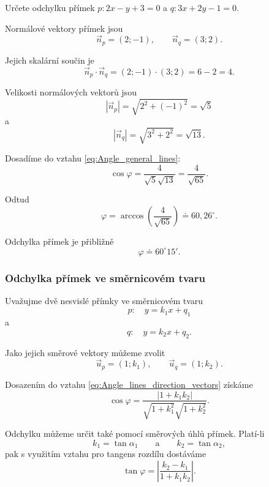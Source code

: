 \begin{example}\label{exa:Angle_general_line_equations}
    Určete odchylku přímek $p: 2x-y+3=0$ a $q:3x+2y-1=0$.

    Normálové vektory přímek jsou
    \[
        \vec{n}_p=(2;-1),
        \qquad
        \vec{n}_q=(3;2).
    \]

    Jejich skalární součin je
    \[
        \vec{n}_p\cdot\vec{n}_q
        =
        (2;-1)\cdot(3;2)
        =
        6-2
        =
        4.
    \]

    Velikosti normálových vektorů jsou
    \[
        |\vec{n}_p|=\sqrt{2^2+(-1)^2}=\sqrt5
    \]
    a
    \[
        |\vec{n}_q|=\sqrt{3^2+2^2}=\sqrt{13}.
    \]

    Dosadíme do vztahu \eqref{eq:Angle_general_lines}:
    \[
        \cos\varphi
        =
        \frac{4}{\sqrt5\sqrt{13}}
        =
        \frac{4}{\sqrt{65}}.
    \]

    Odtud
    \[
        \varphi
        =
        \arccos\left(\frac{4}{\sqrt{65}}\right)
        \doteq
        60{,}26^\circ.
    \]

    Odchylka přímek je přibližně
    \[
        \varphi\doteq60^\circ15'.
    \]
\end{example}


\subsubsection{Odchylka přímek ve směrnicovém tvaru}
\label{subsubsec:Angle_slope_lines}

Uvažujme dvě nesvislé přímky ve směrnicovém tvaru
\[
    p:\quad y=k_1x+q_1
\]
a
\[
    q:\quad y=k_2x+q_2.
\]

Jako jejich směrové vektory můžeme zvolit
\[
    \vec{u}_p=(1;k_1),
    \qquad
    \vec{u}_q=(1;k_2).
\]

Dosazením do vztahu
\eqref{eq:Angle_lines_direction_vectors} získáme
\begin{equation}\label{eq:Angle_slope_lines_cosine}
    \cos\varphi
    =
    \frac{|1+k_1k_2|}
    {\sqrt{1+k_1^2}\sqrt{1+k_2^2}}.
\end{equation}

Odchylku můžeme určit také pomocí směrových úhlů přímek. Platí-li
\[
    k_1=\tan\alpha_1
    \qquad\text{a}\qquad
    k_2=\tan\alpha_2,
\]
pak s využitím vztahu pro tangens rozdílu dostáváme
\begin{equation}\label{eq:Angle_slope_lines_tangent}
    \tan\varphi
    =
    \left|
        \frac{k_2-k_1}{1+k_1k_2}
    \right|.
\end{equation}

